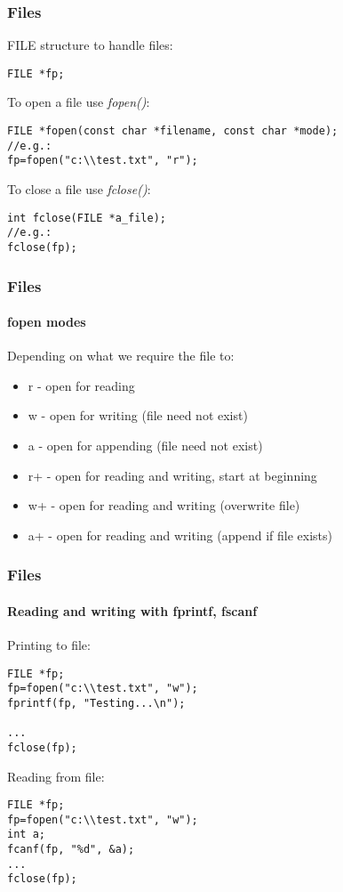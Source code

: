 \documentclass[10pt]{beamer}
\begin{document}
\begin{frame}[fragile]
  \frametitle{Files}
FILE structure to handle files:
\begin{lstlisting}
FILE *fp;
\end{lstlisting}

To open a file use \textit{fopen()}:
\begin{lstlisting}
FILE *fopen(const char *filename, const char *mode);
//e.g.:
fp=fopen("c:\\test.txt", "r");
\end{lstlisting}

To close a file use \textit{fclose()}:
\begin{lstlisting}
int fclose(FILE *a_file);
//e.g.:
fclose(fp);
\end{lstlisting}
 
\end{frame}

\begin{frame}[fragile]
  \frametitle{Files}
  \framesubtitle{fopen modes}
  Depending on what we require the file to:
\begin{itemize}
	\item r  - open for reading
	\item w  - open for writing (file need not exist)
	\item a  - open for appending (file need not exist)
	\item r+ - open for reading and writing, start at beginning
	\item w+ - open for reading and writing (overwrite file)
	\item a+ - open for reading and writing (append if file exists)
\end{itemize}



\end{frame}

\begin{frame}[fragile]
  \frametitle{Files}
  \framesubtitle{Reading and writing with fprintf, fscanf}
Printing to file:
\begin{lstlisting}
FILE *fp;
fp=fopen("c:\\test.txt", "w");
fprintf(fp, "Testing...\n");

...
fclose(fp);
\end{lstlisting}

Reading from file:
\begin{lstlisting}
FILE *fp;
fp=fopen("c:\\test.txt", "w");
int a;
fcanf(fp, "%d", &a);
...
fclose(fp);
\end{lstlisting}
 
\end{frame}
\end{document}
